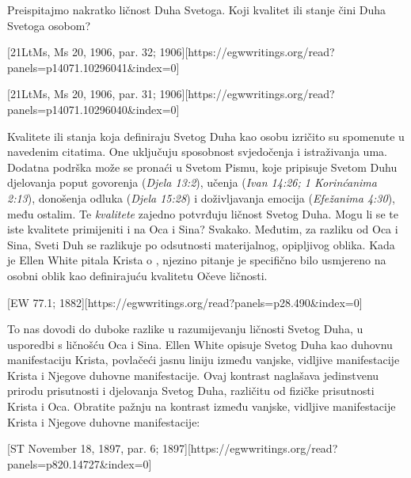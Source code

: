 Preispitajmo nakratko ličnost Duha Svetoga. Koji kvalitet ili stanje čini Duha Svetoga osobom?

[21LtMs, Ms 20, 1906, par. 32; 1906][https://egwwritings.org/read?panels=p14071.10296041&index=0]

[21LtMs, Ms 20, 1906, par. 31; 1906][https://egwwritings.org/read?panels=p14071.10296040&index=0]

Kvalitete ili stanja koja definiraju Svetog Duha kao osobu izričito su spomenute u navedenim citatima. One uključuju sposobnost svjedočenja i istraživanja uma. Dodatna podrška može se pronaći u Svetom Pismu, koje pripisuje Svetom Duhu djelovanja poput govorenja (\textit{Djela 13:2}), učenja (\textit{Ivan 14:26; 1 Korinćanima 2:13}), donošenja odluka (\textit{Djela 15:28}) i doživljavanja emocija (\textit{Efežanima 4:30}), među ostalim. Te \textit{kvalitete} zajedno potvrđuju ličnost Svetog Duha. Mogu li se te iste kvalitete primijeniti i na Oca i Sina? Svakako. Međutim, za razliku od Oca i Sina, Sveti Duh se razlikuje po odsutnosti materijalnog, opipljivog oblika. Kada je Ellen White pitala Krista o , njezino pitanje je specifično bilo usmjereno na osobni oblik kao definirajuću kvalitetu Očeve ličnosti.

[EW 77.1; 1882][https://egwwritings.org/read?panels=p28.490&index=0]

To nas dovodi do duboke razlike u razumijevanju ličnosti Svetog Duha, u usporedbi s ličnošću Oca i Sina. Ellen White opisuje Svetog Duha kao duhovnu manifestaciju Krista, povlačeći jasnu liniju između vanjske, vidljive manifestacije Krista i Njegove duhovne manifestacije. Ovaj kontrast naglašava jedinstvenu prirodu prisutnosti i djelovanja Svetog Duha, različitu od fizičke prisutnosti Krista i Oca. Obratite pažnju na kontrast između vanjske, vidljive manifestacije Krista i Njegove duhovne manifestacije:

[ST November 18, 1897, par. 6; 1897][https://egwwritings.org/read?panels=p820.14727&index=0]

